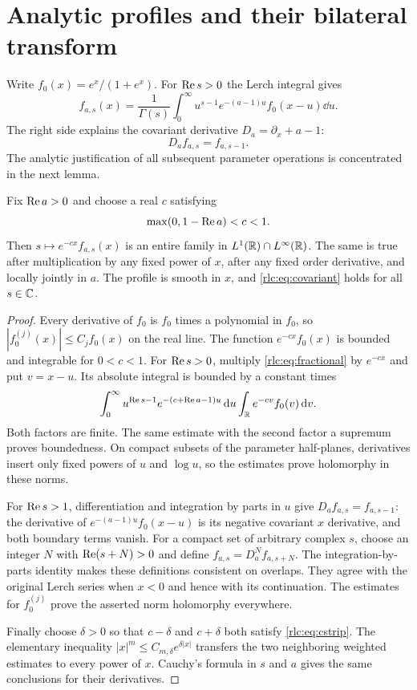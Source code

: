 \section{Analytic profiles and their bilateral transform}
\label{rlc:sec:analysis}

Write $f_0(x)=e^x/(1+e^x)$. For $\operatorname{Re} s>0$ the Lerch integral gives
\begin{equation}\label{rlc:eq:fractional}
 f_{a,s}(x)=\frac1{\Gamma(s)}
 \int_0^\infty u^{s-1}e^{-(a-1)u}f_0(x-u)\dd u.
\end{equation}
The right side explains the covariant derivative
$D_a=\partial_x+a-1$:
\begin{equation}\label{rlc:eq:covariant}
 D_a f_{a,s}=f_{a,s-1}.
\end{equation}
The analytic justification of all subsequent parameter operations is
concentrated in the next lemma.

\begin{lemma}\label{rlc:lem:weighted}
Fix $\operatorname{Re} a>0$ and choose a real $c$ satisfying
\begin{equation}\label{rlc:eq:cstrip}
 \max(0,1-\operatorname{Re} a)<c<1.
\end{equation}
Then $s\mapsto e^{-cx}f_{a,s}(x)$ is an entire family in
$L^1(\mathbb R)\cap L^\infty(\mathbb R)$. The same is true after multiplication by
any fixed power of $x$, after any fixed order derivative, and locally
jointly in $a$. The profile is smooth in $x$, and
\eqref{rlc:eq:covariant} holds for all $s\in\mathbb C$.
\end{lemma}
\begin{proof}
Every derivative of $f_0$ is $f_0$ times a polynomial in $f_0$, so
$|f_0^{(j)}(x)|\le C_j f_0(x)$ on the real line. The function
$e^{-cx}f_0(x)$ is bounded and integrable for $0<c<1$.
For $\operatorname{Re} s>0$, multiply \eqref{rlc:eq:fractional} by $e^{-cx}$ and
put $v=x-u$. Its absolute integral is bounded by a constant times
\[
 \int_0^\infty u^{\operatorname{Re} s-1}
 e^{-(c+\operatorname{Re} a-1)u}\,\mathrm d u
 \int_\mathbb R e^{-cv}f_0(v)\,\mathrm d v.
\]
Both factors are finite. The same estimate with the second factor a
supremum proves boundedness. On compact subsets of the parameter
half-planes, derivatives insert only fixed powers of $u$ and $\log u$,
so the estimates prove holomorphy in these norms.

For $\operatorname{Re} s>1$, differentiation and integration by parts in $u$ give
$D_a f_{a,s}=f_{a,s-1}$: the derivative of
$e^{-(a-1)u}f_0(x-u)$ is its negative covariant $x$ derivative, and
both boundary terms vanish. For a compact set of arbitrary complex
$s$, choose an integer $N$ with $\operatorname{Re}(s+N)>0$ and define
$f_{a,s}=D_a^Nf_{a,s+N}$. The integration-by-parts identity makes these
definitions consistent on overlaps. They agree with the original Lerch
series when $x<0$ and hence with its continuation. The estimates for
$f_0^{(j)}$ prove the asserted norm holomorphy everywhere.

Finally choose $\delta>0$ so that $c-\delta$ and $c+\delta$ both satisfy
\eqref{rlc:eq:cstrip}. The elementary inequality
$|x|^m\le C_{m,\delta}e^{\delta|x|}$ transfers the two neighboring
weighted estimates to every power of $x$. Cauchy's formula in $s$ and
$a$ gives the same conclusions for their derivatives.
\end{proof}

